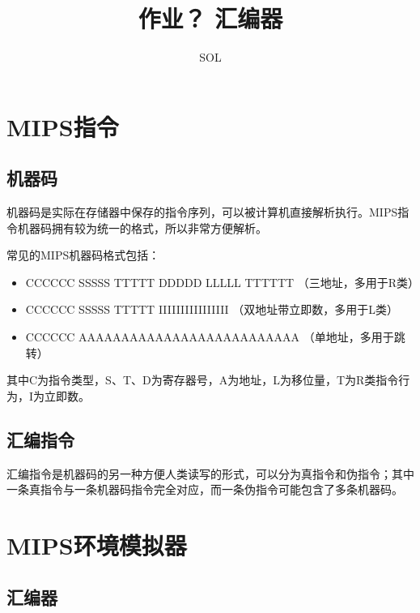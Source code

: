 \documentclass{ctexart}
\author{SOL}
\title{作业？ 汇编器}
\begin{document}
\maketitle
\setcounter{page}{1}

\newpage

\section {MIPS指令}

    \subsection {机器码}
    
        \par 机器码是实际在存储器中保存的指令序列，可以被计算机直接解析执行。MIPS指令机器码拥有较为统一的格式，所以非常方便解析。
        \par 常见的MIPS机器码格式包括：
        
        \begin{itemize}
            \item CCCCCC SSSSS TTTTT DDDDD LLLLL TTTTTT （三地址，多用于R类）
            \item CCCCCC SSSSS TTTTT IIIIIIIIIIIIIIII （双地址带立即数，多用于L类）
            \item CCCCCC AAAAAAAAAAAAAAAAAAAAAAAAAA （单地址，多用于跳转）
        \end{itemize}
        \par 其中C为指令类型，S、T、D为寄存器号，A为地址，L为移位量，T为R类指令行为，I为立即数。

    \subsection {汇编指令}
        
        \par 汇编指令是机器码的另一种方便人类读写的形式，可以分为真指令和伪指令；其中一条真指令与一条机器码指令完全对应，而一条伪指令可能包含了多条机器码。
        

\section {MIPS环境模拟器}
            
    \subsection {汇编器}
\end{document}
